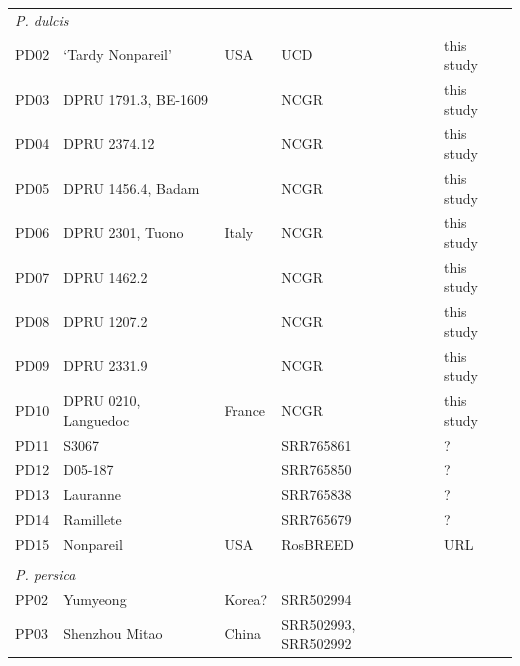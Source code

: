 \documentclass[12pt]{article}
\begin{document}
{\begin{center}
\begin{longtable}{lllll}
                 \multicolumn{5}{l}{\em{P. dulcis}}  \\
                 PD02 &‘Tardy Nonpareil’ &USA &UCD &this study\\ %
                 PD03 &DPRU 1791.3, BE-1609 & &NCGR &this study\\ %
                 PD04 &DPRU 2374.12 & &NCGR &this study\\ %
                 PD05 &DPRU 1456.4, Badam & &NCGR &this study\\ %
                 PD06 &DPRU 2301, Tuono &Italy &NCGR &this study\\ %
                 PD07 &DPRU 1462.2 & &NCGR &this study\\ %
                 PD08 &DPRU 1207.2 & &NCGR &this study\\ %
                 PD09 &DPRU 2331.9 & &NCGR &this study\\ %
                 PD10 &DPRU 0210, Languedoc &France &NCGR &this study\\ %
                 PD11 &S3067 & &SRR765861 &\citealt{koepke2013comparative}?\\
                 PD12 &D05-187 & &SRR765850 &\citealt{koepke2013comparative}?\\
                 PD13 &Lauranne & &SRR765838 &\citealt{koepke2013comparative}?\\
                 PD14 &Ramillete & &SRR765679 &\citealt{koepke2013comparative}?\\
                 PD{\color{red}15} &Nonpareil & USA&RosBREED &URL \\
                 \\
                 \multicolumn{5}{l}{\em{P. persica}}  \\ %
                 PP02 &Yumyeong &Korea? &SRR502994 &\citealt{verde2013high}\\
                 PP03 &Shenzhou Mitao&China &\multirow{2}{1cm}{SRR502993, SRR502992} &\citealt{verde2013high}\\

\end{longtable}
\end{center}}
\end{document}

